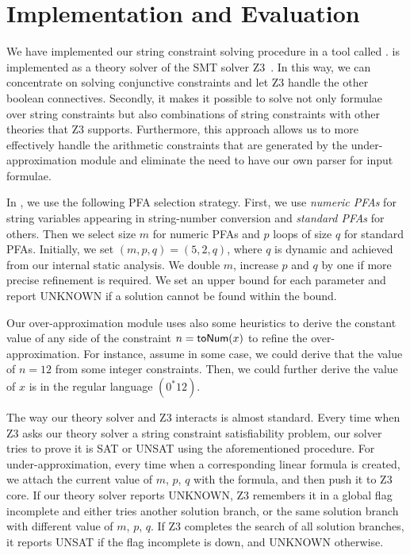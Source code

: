 \section{Implementation and Evaluation}
\label{section:evaluation}

We have implemented our string constraint solving procedure in a tool called {\tool}. {\tool} is implemented as a theory solver of the SMT solver Z3~\cite{z3}. In this way, we can concentrate on solving conjunctive constraints and let Z3 handle the other boolean connectives. Secondly, it makes it possible to solve not only formulae over string constraints but also combinations of string constraints with other theories that Z3 supports. Furthermore, this approach allows us to more effectively handle the arithmetic constraints that are generated by the under-approximation module and eliminate the need to have our own parser for input formulae. 

In {\tool}, we use the following PFA selection strategy. First, we use \emph{numeric PFAs} for string variables appearing in string-number conversion and \emph{standard PFAs} for others. Then we select size $m$ for numeric PFAs and $p$ loops of size $q$ for standard PFAs. Initially, we set $(m,p,q)=(5,2,q)$, where $q$ is dynamic and achieved from our internal static analysis. We double $m$, increase $p$ and $q$ by one if more precise refinement is required. We set an upper bound for each parameter and report UNKNOWN if a solution cannot be found within the bound.

Our over-approximation module uses also some heuristics to derive the constant value of any side of the constraint $n=\mbox{\textsf{toNum}($x$)}$ to refine the over-approximation. For instance, assume in some case, we could derive that the value of $n=12$ from some integer constraints.  Then, we could further derive the value of $x$ is in the regular language $(0^*12)$. 

The way our theory solver and Z3 interacts is almost standard. Every time when Z3 asks our theory solver a string constraint satisfiability problem, our solver tries to prove it is SAT or UNSAT using the aforementioned procedure. For under-approximation, every time when a corresponding linear formula is created, we attach the current value of $m$, $p$, $q$ with the formula, and then push it to Z3 core. If our theory solver reports UNKNOWN, Z3 remembers it in a global flag \textsf{incomplete} and either tries another solution branch, or the same solution branch with different value of $m$, $p$, $q$. If Z3 completes the search of all solution branches, it reports UNSAT if the flag \textsf{incomplete} is down, and UNKNOWN otherwise.




